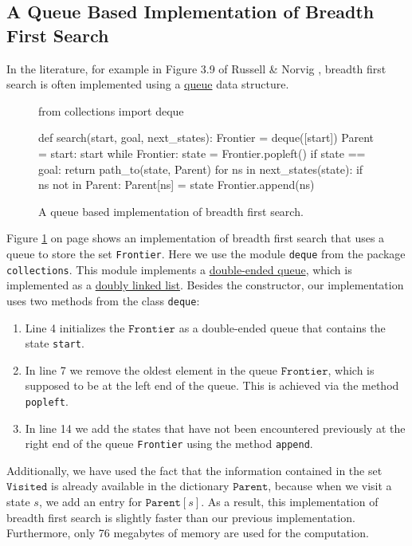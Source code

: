 \subsection{A Queue Based Implementation of Breadth First Search}
In the literature, for example in Figure 3.9 of Russell \& Norvig \cite{russell:2020}, breadth
first search is often implemented using a
\href{https://en.wikipedia.org/wiki/Queue_(abstract_data_type)}{queue} data structure.

\begin{figure}[!ht]
\centering
\begin{python3code}
    from collections import deque

    def search(start, goal, next_states):
        Frontier = deque([start])
        Parent   = { start: start }
        while Frontier:
            state = Frontier.popleft()
            if state == goal:
                return path_to(state, Parent)
            for ns in next_states(state):
                if ns not in Parent:
                    Parent[ns] = state
                    Frontier.append(ns)
\end{python3code}
\vspace*{-0.3cm}
\caption{A queue based implementation of breadth first search.}
\label{fig:Breadth-First-Search-Queue.ipynb}
\end{figure}

Figure \ref{fig:Breadth-First-Search-Queue.ipynb} on page
\pageref{fig:Breadth-First-Search-Queue.ipynb} shows an implementation of breadth first search that
uses a queue to store the set \texttt{Frontier}.   Here we use the module \texttt{deque} from the package
\texttt{collections}. This module implements a
\href{https://en.wikipedia.org/wiki/Double-ended_queue}{double-ended queue}, 
which is implemented as a 
\href{https://en.wikipedia.org/wiki/Doubly_linked_list}{doubly linked list}. 
Besides the constructor, our
implementation uses two methods from the class \texttt{deque}:
\begin{enumerate}
\item Line 4 initializes the $\texttt{Frontier}$ as a double-ended queue that contains the state \texttt{start}.
\item In line 7 we remove the oldest element in the queue $\texttt{Frontier}$, which is supposed to be at the
      left end of the queue.  This is achieved via the method \texttt{popleft}.
\item In line 14 we add the states that have not been encountered previously at the right end of the queue
      \texttt{Frontier} using the method \texttt{append}.
\end{enumerate}
Additionally, we have used the fact that the information contained in the set $\texttt{Visited}$ is already
available in the dictionary $\texttt{Parent}$, because when we visit a state $s$, we add an entry for
$\mathtt{Parent}[s]$.  As a result, this implementation of breadth first search is slightly faster than our
previous implementation.  Furthermore, only 76 megabytes of memory are used for the computation.




